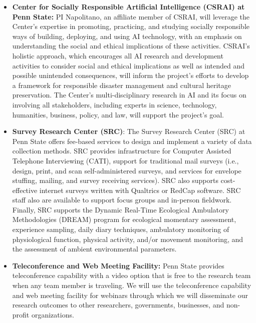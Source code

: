 \documentclass[11pt]{article}
\begin{document}
\begin{itemize}
Dr. Busse is one of three faculty that shares a closed loop water channel built by Engineering Laboratory Design, Inc.

\item \textbf{Center for Socially Responsible Artificial Intelligence (CSRAI) at Penn State:} 
PI Napolitano, an affiliate member of CSRAI, will leverage the Center's expertise in promoting, practicing, and studying socially responsible ways of building, deploying, and using AI technology, with an emphasis on understanding the social and ethical implications of these activities. CSRAI's holistic approach, which encourages all AI research and development activities to consider social and ethical implications as well as intended and possible unintended consequences, will inform the project's efforts to develop a framework for responsible disaster management and cultural heritage preservation. The Center's multi-disciplinary research in AI and its focus on involving all stakeholders, including experts in science, technology, humanities, business, policy, and law, will support the project's goal. 

\item \textbf{Survey Research Center (SRC)}: The Survey Research Center (SRC) at Penn State offers fee-based services to design and implement a variety of data collection methods. SRC provides infrastructure for Computer Assisted Telephone Interviewing (CATI), support for traditional mail surveys (i.e., design, print, and scan self-administered surveys, and services for envelope stuffing, mailing, and survey receiving services). SRC also supports cost-effective internet surveys written with Qualtrics or RedCap software. SRC staff also are available to support focus groups and in-person fieldwork. Finally, SRC supports the Dynamic Real-Time Ecological Ambulatory Methodologies (DREAM) program for ecological momentary assessment, experience sampling, daily diary techniques, ambulatory monitoring of physiological function, physical activity, and/or movement monitoring, and the assessment of ambient environmental parameters.  

\item \textbf{Teleconference and Web Meeting Facility:} Penn State provides teleconference capability with a video option that is free to the research team when any team member is traveling. We will use the teleconference capability and web meeting facility for webinars through which we will disseminate our research outcomes to other researchers, governments, businesses, and non-profit organizations.  


\end{itemize}
\end{document}
